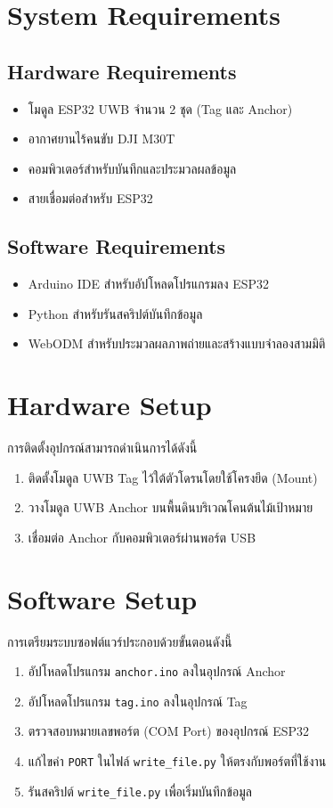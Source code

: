 \section{System Requirements}

\subsection{Hardware Requirements}
\begin{itemize}
    \item โมดูล ESP32 UWB จำนวน 2 ชุด (Tag และ Anchor)
    \item อากาศยานไร้คนขับ DJI M30T
    \item คอมพิวเตอร์สำหรับบันทึกและประมวลผลข้อมูล
    \item สายเชื่อมต่อสำหรับ ESP32
\end{itemize}

\subsection{Software Requirements}
\begin{itemize}
    \item Arduino IDE สำหรับอัปโหลดโปรแกรมลง ESP32
    \item Python สำหรับรันสคริปต์บันทึกข้อมูล
    \item WebODM สำหรับประมวลผลภาพถ่ายและสร้างแบบจำลองสามมิติ
\end{itemize}

\section{Hardware Setup}
การติดตั้งอุปกรณ์สามารถดำเนินการได้ดังนี้

\begin{enumerate}
    \item ติดตั้งโมดูล UWB Tag ไว้ใต้ตัวโดรนโดยใช้โครงยึด (Mount)
    \item วางโมดูล UWB Anchor บนพื้นดินบริเวณโคนต้นไม้เป้าหมาย
    \item เชื่อมต่อ Anchor กับคอมพิวเตอร์ผ่านพอร์ต USB
\end{enumerate}

\section{Software Setup}
การเตรียมระบบซอฟต์แวร์ประกอบด้วยขั้นตอนดังนี้

\begin{enumerate}
    \item อัปโหลดโปรแกรม \texttt{anchor.ino} ลงในอุปกรณ์ Anchor
    \item อัปโหลดโปรแกรม \texttt{tag.ino} ลงในอุปกรณ์ Tag
    \item ตรวจสอบหมายเลขพอร์ต (COM Port) ของอุปกรณ์ ESP32
    \item แก้ไขค่า \texttt{PORT} ในไฟล์ \texttt{write\_file.py} ให้ตรงกับพอร์ตที่ใช้งาน
    \item รันสคริปต์ \texttt{write\_file.py} เพื่อเริ่มบันทึกข้อมูล
\end{enumerate}

